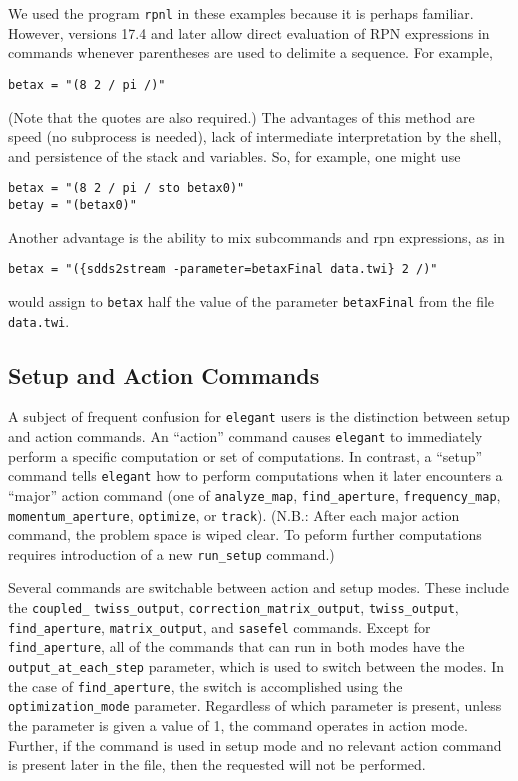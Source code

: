 \documentclass[11pt]{article}
\begin{document}
We used the program {\tt rpnl} in these examples because it is perhaps familiar.  However, versions 17.4 and later
allow direct evaluation of RPN expressions in commands whenever parentheses are used to delimite a sequence.  For example, 
\begin{verbatim}
betax = "(8 2 / pi /)"
\end{verbatim}
(Note that the quotes are also required.)
The advantages of this method are speed (no subprocess is needed),
lack of intermediate interpretation by the shell, and persistence of
the stack and variables.  So, for example, one might use
\begin{verbatim}
betax = "(8 2 / pi / sto betax0)"
betay = "(betax0)"
\end{verbatim}
Another advantage is the ability to mix subcommands and rpn expressions, as in
\begin{verbatim}
betax = "({sdds2stream -parameter=betaxFinal data.twi} 2 /)"
\end{verbatim}
would assign to {\tt betax} half
the value of the parameter {\tt betaxFinal} from
the file {\tt data.twi}.

\subsection{Setup and Action Commands}
 
A subject of frequent confusion for {\tt elegant} users is the
distinction between setup and action commands.  An ``action'' command
causes {\tt elegant} to immediately perform a specific computation or
set of computations.  In contrast, a ``setup'' command tells {\tt elegant}
how to perform computations when it later encounters a ``major'' action
command (one of \verb|analyze_map|, \verb|find_aperture|, \verb|frequency_map|, \verb|momentum_aperture|, \verb|optimize|, 
or \verb|track|).
(N.B.: After each major action command, the problem space is wiped clear. 
To peform further computations requires introduction of a new \verb|run_setup| command.)

Several commands are switchable between action and setup modes.  These
include the \verb|coupled_| \verb|twiss_output|,
\verb|correction_matrix_output|, \verb|twiss_output|,
\verb|find_aperture|, \verb|matrix_output|, and \verb|sasefel|
commands.  Except for \verb|find_aperture|, all of the commands that
can run in both modes have the \verb|output_at_each_step| parameter,
which is used to switch between the modes.  In the case of
\verb|find_aperture|, the switch is accomplished using the
\verb|optimization_mode| parameter.  Regardless of which parameter is
present, unless the parameter is given a value of 1, the command
operates in action mode.  Further, if the command is used in setup mode
and no relevant action command is present later in the file, then the requested
will not be performed.
\end{document}
